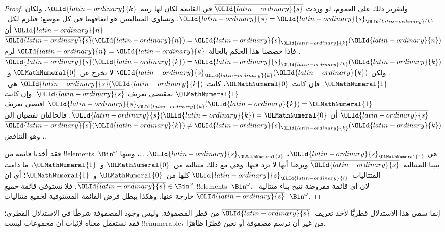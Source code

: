 \documentclass[../../../include/open-logic-section]{subfiles}
\begin{document}
\begin{proof}
ولتقرير ذلك على العموم، لو وردت $\overline{\OLId{latin-ordinary}{s}}$ في القائمة لكان لها رتبة~$\OLId{latin-ordinary}{k}$، ولكان $\overline{\OLId{latin-ordinary}{s}} = \OLId{latin-ordinary}{s}_{\OLId{latin-ordinary}{k}}$. وتساوي المتتاليتين هو اتفاقهما في كل موضع؛ فيلزم لكل~$\OLId{latin-ordinary}{n}$ أن $\overline{\OLId{latin-ordinary}{s}}(\OLId{latin-ordinary}{n}) =
\OLId{latin-ordinary}{s}_{\OLId{latin-ordinary}{k}}(\OLId{latin-ordinary}{n})$. فإذا خصصنا هذا الحكم بالحالة $\OLId{latin-ordinary}{n} = \OLId{latin-ordinary}{k}$ لزم $\overline{\OLId{latin-ordinary}{s}}(\OLId{latin-ordinary}{k}) = \OLId{latin-ordinary}{s}_{\OLId{latin-ordinary}{k}}(\OLId{latin-ordinary}{k})$. ولكن $\OLId{latin-ordinary}{s}_\OLId{latin-ordinary}{k}(\OLId{latin-ordinary}{k})$ لا تخرج عن $\OLMathNumeral{0}$ و~$\OLMathNumeral{1}$. فإن كانت $\OLMathNumeral{0}$، كانت $\overline{\OLId{latin-ordinary}{s}}(\OLId{latin-ordinary}{k})$ هي~$\OLMathNumeral{1}$ بمقتضى تعريف $\overline{\OLId{latin-ordinary}{s}}$. وإن كانت $\OLId{latin-ordinary}{s}_\OLId{latin-ordinary}{k}(\OLId{latin-ordinary}{k}) = \OLMathNumeral{1}$ اقتضى تعريف $\overline{\OLId{latin-ordinary}{s}}$ أن $\overline{\OLId{latin-ordinary}{s}}(\OLId{latin-ordinary}{k}) = \OLMathNumeral{0}$. فالحالتان تفضيان إلى $\overline{\OLId{latin-ordinary}{s}}(\OLId{latin-ordinary}{k}) \neq \OLId{latin-ordinary}{s}_{\OLId{latin-ordinary}{k}}(\OLId{latin-ordinary}{k})$، وهو التناقض.

فقد أخذنا قائمة من !!{element}s~$\Bin^\omega$ هي $\OLId{latin-ordinary}{s}_\OLMathNumeral{1}$، $\OLId{latin-ordinary}{s}_\OLMathNumeral{2}$، \dots{}، ومنها بنينا المتتالية~$\overline{\OLId{latin-ordinary}{s}}$ وبرهنا أنها لا ترد فيها. وهي مع ذلك متتالية من~$\OLMathNumeral{0}$ و~$\OLMathNumeral{1}$، ما دامت المتتاليات~$\OLId{latin-ordinary}{s}_\OLId{latin-ordinary}{i}$ كلها من~$\OLMathNumeral{0}$ و~$\OLMathNumeral{1}$؛ أي إن $\overline{\OLId{latin-ordinary}{s}} \in
\Bin^\omega$. فلا تستوفي قائمة \emph{جميع} !!{element}s~$\Bin^\omega$، لأن أي قائمة مفروضة تتيح بناء متتالية~$\overline{\OLId{latin-ordinary}{s}}$ خارجة عنها. وهكذا يبطل فرض القائمة المستوفية لجميع متتاليات~$\Bin^\omega$.
\end{proof}

\begin{explain}
إنما سمي هذا الاستدلال قطريًّا لأخذ تعريف~$\overline{\OLId{latin-ordinary}{s}}$ من قطر المصفوفة. وليس وجود المصفوفة شرطًا في الاستدلال القطري؛ فقد نستعمل معناه لإثبات أن مجموعات ليست !!{enumerable}، من غير أن نرسم مصفوفة أو نعين قطرًا ظاهرًا.
\end{explain}
\end{document}
